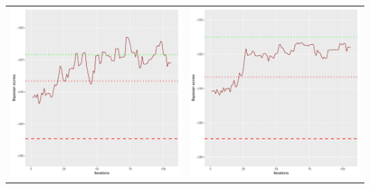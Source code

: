 \documentclass[]{scrartcl}
\begin{document}
\begin{table}[h!]
\begin{tabular}{cc}
\includegraphics[scale = 0.4]{./figs/asia/v1/10/bayBoundsEvolution-107.pdf} & 
\includegraphics[scale = 0.4]{./figs/asia/v1/20/bayBoundsEvolution-107.pdf} \\

\end{tabular}
\end{table}
\end{document}
